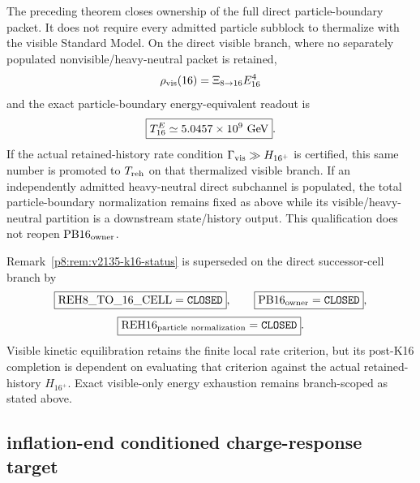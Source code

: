 \documentclass[12pt,a4paper]{article}
\begin{document}
\begin{remark}
\label{p8:rem:v2136-visible-heavy-neutral-scope}
The preceding theorem closes ownership of the full direct particle-boundary
packet.  It does not require every admitted particle subblock to thermalize
with the visible Standard Model.  On the direct visible branch, where no
separately populated nonvisible/heavy-neutral packet is retained,
\[
 \rho_{\rm vis}(16)=\Xi_{8\to16}E_{16}^4
\]
and the exact particle-boundary energy-equivalent readout is
\[
 \boxed{T_{16}^{E}\simeq5.0457\times10^9\ {\rm GeV}}.
\]
If the actual retained-history rate condition
$\Gamma_{\rm vis}\gg H_{16^+}$ is certified, this same number is promoted to
$T_{\rm reh}$ on that thermalized visible branch.
If an independently admitted heavy-neutral direct subchannel is populated,
the total particle-boundary normalization remains fixed as above while its
visible/heavy-neutral partition is a downstream state/history output.  This
qualification does not reopen $\mathrm{PB16}_{\rm owner}$.
\end{remark}

\begin{remark}
\label{p8:rem:v2136-supersede-v2135-owner-frontier}
Remark~\ref{p8:rem:v2135-k16-status} is superseded on the direct
successor-cell branch by
\[
 \boxed{\mathrm{REH8\_TO\_16\_CELL}=\texttt{CLOSED}},\qquad
 \boxed{\mathrm{PB16}_{\rm owner}=\texttt{CLOSED}},
\]
\[
 \boxed{\mathrm{REH16}_{\rm particle\ normalization}=\texttt{CLOSED}}.
\]
Visible kinetic equilibration retains the finite local rate criterion, but its
post-K16 completion is dependent on evaluating that criterion against the actual
retained-history $H_{16^+}$.  Exact visible-only energy exhaustion remains
branch-scoped as stated above.
\end{remark}

\subsection{inflation-end conditioned charge-response target}
\label{p8:sec:v2137-inflation-end-boundary-baryogenesis}
\end{document}
